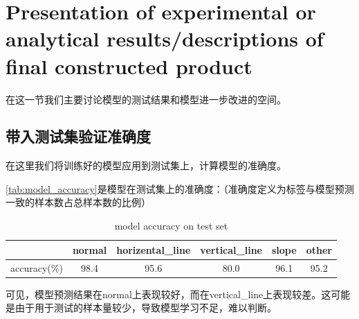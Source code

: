 \section{Presentation of experimental or analytical results/descriptions of final constructed product}
在这一节我们主要讨论模型的测试结果和模型进一步改进的空间。


\subsection{带入测试集验证准确度}

在这里我们将训练好的模型应用到测试集上，计算模型的准确度。

\autoref{tab:model_accuracy}是模型在测试集上的准确度：（准确度定义为标签与模型预测一致的样本数占总样本数的比例）

\begin{table}[H]
\centering
\caption{model accuracy on test set}
\begin{tabular}{cccccc}
    \toprule
    & normal & horizental\_line & vertical\_line & slope & other \\
    \midrule
    accuracy(\%) & 98.4 & 95.6 & 80.0 & 96.1 & 95.2 \\
    \bottomrule
\end{tabular}
\label{tab:model_accuracy}
\end{table}



可见，模型预测结果在normal上表现较好，而在vertical\_line上表现较差。这可能是由于用于测试的样本量较少，导致模型学习不足，难以判断。

